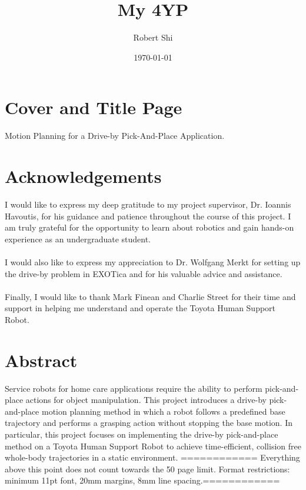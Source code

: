 \documentclass[12pt]{article}
\title{My 4YP}
\author{Robert Shi}
\date{\today}
\begin{document}
\maketitle
\newpage
\section{Cover and Title Page}
    Motion Planning for a Drive-by Pick-And-Place Application.
\newpage
\section{Acknowledgements}
    I would like to express my deep gratitude to my project supervisor, Dr. Ioannis Havoutis, for his guidance and patience throughout the course of this project. I am truly grateful for the opportunity to learn about robotics and gain hands-on experience as an undergraduate student.\\
    \hspace*{\fill}\\
    I would also like to express my appreciation to Dr. Wolfgang Merkt for setting up the drive-by problem in EXOTica and for his valuable advice and assistance.\\
    \hspace*{\fill}\\
    Finally, I would like to thank Mark Finean and Charlie Street for their time and support in helping me understand and operate the Toyota Human Support Robot.
\newpage


\section{Abstract}
    Service robots for home care applications require the ability to perform pick-and-place actions for object manipulation. This project introduces a drive-by pick-and-place motion planning method in which a robot follows a predefined base trajectory and performs a grasping action without stopping the base motion. In particular, this project focuses on implementing the drive-by pick-and-place method on a Toyota Human Support Robot to achieve time-efficient, collision free whole-body trajectories in a static environment.
\newpage
\tableofcontents
============
Everything above this point does not count towards the 50 page limit.
Format restrictions: minimum 11pt font,  20mm margins, 8mm line spacing.============
\newpage
\end{document}

